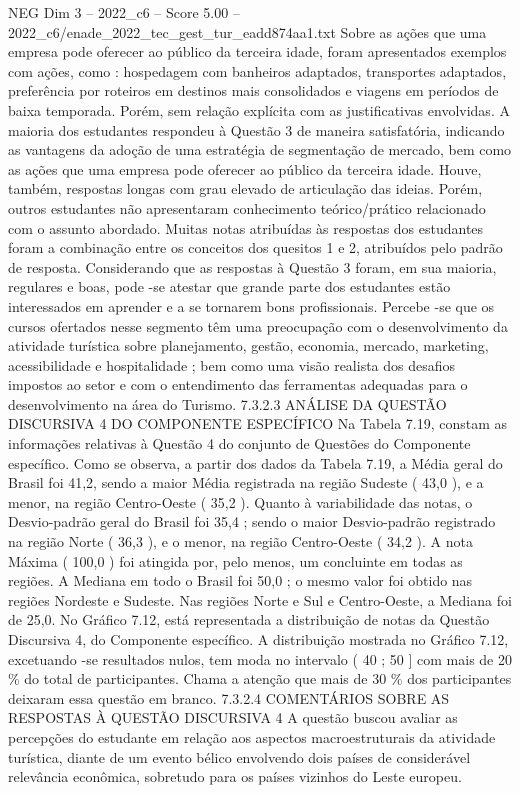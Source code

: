 \begin{textsample}{NEG Dim 3 – 2022\_c6 – Score 5.00 – 2022\_c6/enade\_2022\_tec\_gest\_tur\_eadd874aa1.txt}
Sobre as ações que uma empresa pode oferecer ao público da terceira idade, foram apresentados exemplos com ações, como : hospedagem com banheiros adaptados, transportes adaptados, preferência por roteiros em destinos mais consolidados e viagens em períodos de baixa temporada.
Porém, sem relação explícita com as justificativas envolvidas.
A maioria dos estudantes respondeu à Questão 3 de maneira satisfatória, indicando as vantagens da adoção de uma estratégia de segmentação de mercado, bem como as ações que uma empresa pode oferecer ao público da terceira idade.
Houve, também, respostas longas com grau elevado de articulação das ideias.
Porém, outros estudantes não apresentaram conhecimento teórico/prático relacionado com o assunto abordado.
Muitas notas atribuídas às respostas dos estudantes foram a combinação entre os conceitos dos quesitos 1 e 2, atribuídos pelo padrão de resposta.
Considerando que as respostas à Questão 3 foram, em sua maioria, regulares e boas, pode -se atestar que grande parte dos estudantes estão interessados em aprender e a se tornarem bons profissionais.
Percebe -se que os cursos ofertados nesse segmento têm uma preocupação com o desenvolvimento da atividade turística sobre planejamento, gestão, economia, mercado, marketing, acessibilidade e hospitalidade ; bem como uma visão realista dos desafios impostos ao setor e com o entendimento das ferramentas adequadas para o desenvolvimento na área do Turismo. 7.3.2.3 ANÁLISE DA QUESTÃO DISCURSIVA 4 DO COMPONENTE ESPECÍFICO Na Tabela 7.19, constam as informações relativas à Questão 4 do conjunto de Questões do Componente específico.
Como se observa, a partir dos dados da Tabela 7.19, a Média geral do Brasil foi 41,2, sendo a maior Média registrada na região Sudeste ( 43,0 ), e a menor, na região Centro-Oeste ( 35,2 ).
Quanto à variabilidade das notas, o Desvio-padrão geral do Brasil foi 35,4 ; sendo o maior Desvio-padrão registrado na região Norte ( 36,3 ), e o menor, na região Centro-Oeste ( 34,2 ).
A nota Máxima ( 100,0 ) foi atingida por, pelo menos, um concluinte em todas as regiões.
A Mediana em todo o Brasil foi 50,0 ; o mesmo valor foi obtido nas regiões Nordeste e Sudeste.
Nas regiões Norte e Sul e Centro-Oeste, a Mediana foi de 25,0.
No Gráfico 7.12, está representada a distribuição de notas da Questão Discursiva 4, do Componente específico.
A distribuição mostrada no Gráfico 7.12, excetuando -se resultados nulos, tem moda no intervalo ( 40 ; 50 ] com mais de 20 \% do total de participantes.
Chama a atenção que mais de 30 \% dos participantes deixaram essa questão em branco. 7.3.2.4 COMENTÁRIOS SOBRE AS RESPOSTAS À QUESTÃO DISCURSIVA 4 A questão buscou avaliar as percepções do estudante em relação aos aspectos macroestruturais da atividade turística, diante de um evento bélico envolvendo dois países de considerável relevância econômica, sobretudo para os países vizinhos do Leste europeu.

\end{textsample}
